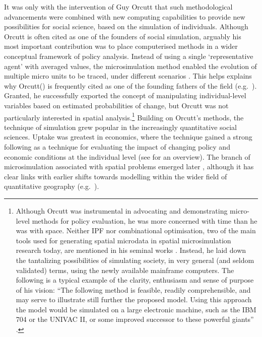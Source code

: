 It was only with the intervention of Guy Orcutt that such methodological
advancements were combined with new computing capabilities to provide new
possibilities for social science, based on the simulation of individuals.
Although Orcutt is often cited as one of the founders of social simulation,
arguably his most important contribution was to place computerised methods in a
wider conceptual framework of policy analysis. Instead of using a
single `representative agent' with averaged values, the microsimulation method
enabled the evolution of multiple micro units to be traced, under different
scenarios \citep[p.~176]{mitton2000microsimulation}.
This helps explains why Orcutt(\citeyear{Orcutt1957-new-type,
orcutt1961microanalysis}) is frequently cited as one of the founding fathers of
the field
(e.g.~\citealp{Clarke+Longley1989-UK-housing-sim,Wu2008,
Ballas2013-4policy-analysis}). Granted, he successfully exported the concept of
manipulating individual-level variables based on estimated
probabilities of change, but Orcutt was not particularly interested in
spatial analysis.\footnote{Although
Orcutt was instrumental in advocating and demonstrating
micro-level methods for policy evaluation, he was more concerned with time than
he was with
space. %
Neither IPF nor combinational optimisation, two of the main tools used for
generating spatial microdata in spatial microsimulation research today,
are mentioned in his seminal works
\citep{Orcutt1957-new-type,orcutt1961microanalysis}.
Instead, he laid down the tantalizing possibilities of simulating society, in
very general (and seldom validated) terms, using the newly available
mainframe computers. The following is a typical example of the clarity,
enthusiasm and sense of purpose of his vision: ``The following method is
feasible, readily comprehensible, and may serve to illustrate still further the
proposed model. Using this approach the model would be simulated on a large
electronic machine, such as the IBM 704 or the UNIVAC II, or some improved
successor to these powerful giants'' \citep[p.~119]{Orcutt1957-new-type}.
}
Building on Orcutt's methods, the technique of simulation grew popular in the
increasingly quantitative social sciences. Uptake was
greatest in economics, where the technique
gained a strong following as a technique for evaluating the impact of
changing policy and economic conditions at the individual level
(see \citealp{Merz1994} for an overview).
The branch of microsimulation associated with spatial problems emerged later
\citep{Tanton2013-intro}, although it has clear links with earlier shifts
towards modelling within the wider field of quantitative geography
(e.g.~\citealp{Clarke1985}).


